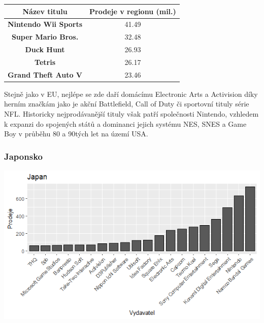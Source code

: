 \documentclass[a4paper,11pt]{article}
\begin{document}
\begin{center}
\begin{tabular}{|c|c|}
\hline
\textbf{Název titulu}       & \textbf{Prodeje v regionu (mil.)} \\ \hline
\textbf{Nintendo Wii Sports}         & 41.49                             \\ \hline
\textbf{Super Mario Bros.}  & 32.48                             \\ \hline
\textbf{Duck Hunt}          & 26.93                             \\ \hline
\textbf{Tetris}             & 26.17                             \\ \hline
\textbf{Grand Theft Auto V} & 23.46                             \\ \hline
\end{tabular}
\end{center}

Stejně jako v EU, nejlépe se zde daří domácímu Electronic Arts a Activision díky herním značkám jako je akční Battlefield, Call of Duty či sportovní tituly série NFL. Historicky nejprodávanější tituly však patří společnosti Nintendo, vzhledem k expanzi do spojených států a dominanci jejich systému NES, SNES a Game Boy v průběhu 80 a 90tých let na území USA.

\newpage

\subsubsection{Japonsko}
\includegraphics[scale=0.8]{Rplot12}
\end{document}
